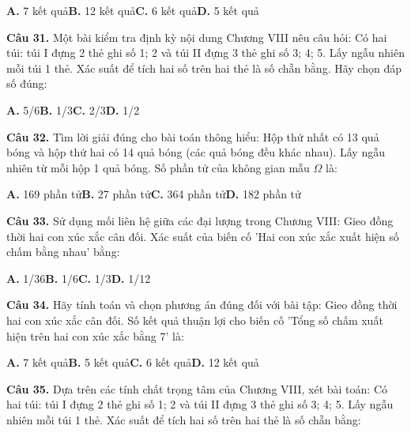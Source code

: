 \documentclass[11pt,a4paper]{article}
\begin{document}
\hspace*{1.5em}\textbf{A.} 7 kết quả\quad\quad \textbf{B.} 12 kết quả\quad\quad \textbf{C.} 6 kết quả\quad\quad \textbf{D.} 5 kết quả\par\vspace{2pt}
\textbf{\color{primary} Câu 31.} Một bài kiểm tra định kỳ nội dung Chương VIII nêu câu hỏi: Có hai túi: túi I đựng 2 thẻ ghi số 1; 2 và túi II đựng 3 thẻ ghi số 3; 4; 5. Lấy ngẫu nhiên mỗi túi 1 thẻ. Xác suất để tích hai số trên hai thẻ là số chẵn bằng. Hãy chọn đáp số đúng:\par
\hspace*{1.5em}\textbf{A.} 5/6\quad\quad \textbf{B.} 1/3\quad\quad \textbf{C.} 2/3\quad\quad \textbf{D.} 1/2\par\vspace{2pt}
\textbf{\color{primary} Câu 32.} Tìm lời giải đúng cho bài toán thông hiểu: Hộp thứ nhất có 13 quả bóng và hộp thứ hai có 14 quả bóng (các quả bóng đều khác nhau). Lấy ngẫu nhiên từ mỗi hộp 1 quả bóng. Số phần tử của không gian mẫu $\Omega$ là:\par
\hspace*{1.5em}\textbf{A.} 169 phần tử\quad\quad \textbf{B.} 27 phần tử\quad\quad \textbf{C.} 364 phần tử\quad\quad \textbf{D.} 182 phần tử\par\vspace{2pt}
\textbf{\color{primary} Câu 33.} Sử dụng mối liên hệ giữa các đại lượng trong Chương VIII: Gieo đồng thời hai con xúc xắc cân đối. Xác suất của biến cố 'Hai con xúc xắc xuất hiện số chấm bằng nhau' bằng:\par
\hspace*{1.5em}\textbf{A.} 1/36\quad\quad \textbf{B.} 1/6\quad\quad \textbf{C.} 1/3\quad\quad \textbf{D.} 1/12\par\vspace{2pt}
\textbf{\color{primary} Câu 34.} Hãy tính toán và chọn phương án đúng đối với bài tập: Gieo đồng thời hai con xúc xắc cân đối. Số kết quả thuận lợi cho biến cố 'Tổng số chấm xuất hiện trên hai con xúc xắc bằng 7' là:\par
\hspace*{1.5em}\textbf{A.} 7 kết quả\quad\quad \textbf{B.} 5 kết quả\quad\quad \textbf{C.} 6 kết quả\quad\quad \textbf{D.} 12 kết quả\par\vspace{2pt}
\textbf{\color{primary} Câu 35.} Dựa trên các tính chất trọng tâm của Chương VIII, xét bài toán: Có hai túi: túi I đựng 2 thẻ ghi số 1; 2 và túi II đựng 3 thẻ ghi số 3; 4; 5. Lấy ngẫu nhiên mỗi túi 1 thẻ. Xác suất để tích hai số trên hai thẻ là số chẵn bằng:\par
\end{document}
